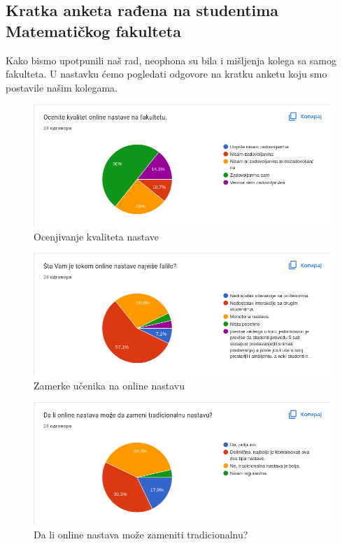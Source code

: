 \documentclass{article}
\begin{document}
\subsection{Kratka anketa rađena na studentima Matematičkog fakulteta}

Kako bismo upotpunili naš rad, neophona su bila i mišljenja kolega sa samog fakulteta. U nastavku ćemo pogledati odgovore na kratku anketu koju smo postavile našim kolegama.

\begin{figure}[h!]
    \centering
    \includegraphics[width=12cm]{1.png}
   \caption{Ocenjivanje kvaliteta nastave}
\end{figure}

\begin{figure}[h!]
\centering
    \includegraphics[width=12cm]{2.png}
    \caption{Zamerke učenika na online nastavu}
\end{figure}

\begin{figure}[h!]
\centering
    \includegraphics[width=12cm]{3.png}
    \caption{Da li online nastava može zameniti tradicionalnu?}
\end{figure}
\end{document}

